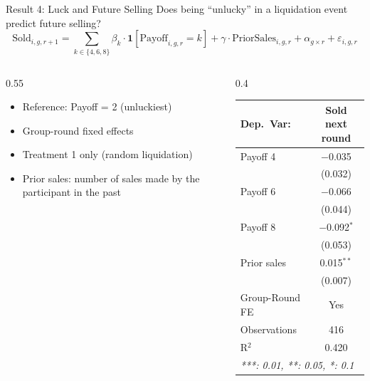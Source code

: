 \documentclass{beamer}
\begin{document}
\begin{frame}{Result 4: Luck and Future Selling}
Does being ``unlucky'' in a liquidation event predict future selling?
\begin{equation*}
\text{Sold}_{i,g,r+1} = \sum_{k \in \{4,6,8\}} \beta_k \cdot \mathbf{1}[\text{Payoff}_{i,g,r} = k] + \gamma \cdot \text{PriorSales}_{i,g,r} + \alpha_{g \times r} + \varepsilon_{i,g,r}
\end{equation*}

\begin{columns}[T]
\begin{column}{0.55\textwidth}
\begin{itemize}
    \item Reference: Payoff = 2 (unluckiest)
    \item Group-round fixed effects
    \item Treatment 1 only (random liquidation)
    \item Prior sales: number of sales made by the participant in the past
\end{itemize}
\end{column}
\begin{column}{0.4\textwidth}
\vspace{-0.3cm}
\centering
\scriptsize
\begin{tabular}{@{}lc@{}}
   \midrule \midrule
   Dep.\ Var:    & Sold next round \\
   \midrule
   Payoff 4                & $-$0.035\\
                           & (0.032)\\
   Payoff 6                & $-$0.066\\
                           & (0.044)\\
   Payoff 8                & $-$0.092$^{*}$\\
                           & (0.053)\\
   Prior sales             & 0.015$^{**}$\\
                           & (0.007)\\
   \midrule
   Group-Round FE          & Yes\\
   Observations            & 416\\
   R$^2$                   & 0.420\\
   \midrule \midrule
   \multicolumn{2}{l}{\tiny\emph{***: 0.01, **: 0.05, *: 0.1}}\\
\end{tabular}
\end{column}
\end{columns}
\end{frame}
\end{document}

